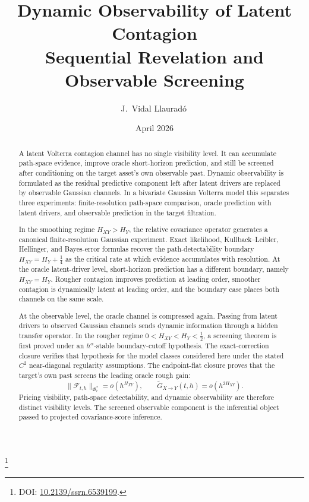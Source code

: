 \documentclass[11pt,a4paper]{amsart}
\theoremstyle{plain}
\theoremstyle{definition}
\theoremstyle{remark}
\begin{document}
\title[Dynamic Observability of Latent Contagion]{%
Dynamic Observability of Latent Contagion\\[0.3em]
{\small Sequential Revelation and Observable Screening}}
\author[J.~Vidal Llaurad\'o]{J.~Vidal Llaurad\'o\,}
\thanks{DOI: \href{https://doi.org/10.2139/ssrn.6539199}{10.2139/ssrn.6539199}.}
\date{April 2026}

\begin{abstract}
A latent Volterra contagion channel has no single visibility level.  It can accumulate
path-space evidence, improve oracle short-horizon prediction, and still be screened after
conditioning on the target asset's own observable past.  Dynamic observability is formulated as the
residual predictive component left after latent drivers are replaced by observable Gaussian
channels.  In a bivariate Gaussian Volterra model this separates three experiments:
finite-resolution path-space comparison, oracle prediction with latent drivers, and observable
prediction in the target filtration.

In the smoothing regime \(H_{XY}>H_Y\), the relative covariance operator generates a canonical
finite-resolution Gaussian experiment.  Exact likelihood, Kullback--Leibler, Hellinger, and
Bayes-error formulas recover the path-detectability boundary
\(H_{XY}=H_Y+\tfrac14\) as the critical rate at which evidence accumulates with resolution.  At the
oracle latent-driver level, short-horizon prediction has a different boundary, namely
\(H_{XY}=H_Y\).  Rougher contagion improves prediction at leading order, smoother contagion is
dynamically latent at leading order, and the boundary case places both channels on the same scale.

At the observable level, the oracle channel is compressed again.  Passing from latent drivers to
observed Gaussian channels sends dynamic information through a hidden transfer operator.  In the
rougher regime \(0<H_{XY}<H_Y<\tfrac12\), a screening theorem is first proved under an
\(h^\alpha\)-stable boundary-cutoff hypothesis.  The exact-correction closure verifies that
hypothesis for the model classes considered here under the stated \(C^2\) near-diagonal regularity
assumptions.  The endpoint-flat closure proves that the target's own past screens the leading
oracle rough gain:
\[
\|\mathcal F_{t,h}\|_{\mathfrak G_t^*}=o(h^{H_{XY}}),
\qquad
\widetilde G_{X\to Y}(t,h)=o(h^{2H_{XY}}).
\]
Pricing visibility, path-space detectability, and dynamic observability are therefore distinct
visibility levels.  The screened observable component is the inferential object passed to
projected covariance-score inference.
\end{abstract}
\end{document}
